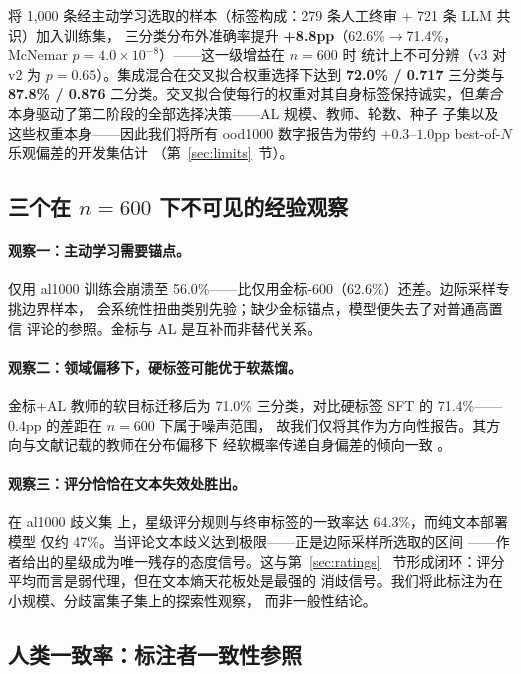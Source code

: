 \documentclass[11pt,a4paper]{article}
\begin{document}
将 1{,}000 条经主动学习选取的样本（标签构成：279 条人工终审 +
721 条 LLM 共识）加入训练集，
三分类分布外准确率提升 \textbf{+8.8pp}（62.6\%$\to$71.4\%，
McNemar $p = 4.0\times10^{-8}$）——这一级增益在 $n{=}600$ 时
统计上不可分辨（v3 对 v2 为 $p = 0.65$）。集成混合在交叉拟合权重选择下达到
\textbf{72.0\% / 0.717} 三分类与 \textbf{87.8\% / 0.876}
二分类。交叉拟合使每行的权重对其自身标签保持诚实，但\emph{集合}
本身驱动了第二阶段的全部选择决策——AL 规模、教师、轮数、种子
子集以及这些权重本身——因此我们将所有 ood1000 数字报告为带约
$+0.3$--$1.0$pp best-of-$N$ 乐观偏差的开发集估计
（第~\ref{sec:limits}~节）。

\subsection{三个在 $n{=}600$ 下不可见的经验观察}
\label{sec:findings}

\paragraph{观察一：主动学习需要锚点。} 仅用 al1000 训练会崩溃至
56.0\%——比仅用金标-600（62.6\%）还差。边际采样专挑边界样本，
会系统性扭曲类别先验；缺少金标锚点，模型便失去了对普通高置信
评论的参照。金标与 AL 是互补而非替代关系。

\paragraph{观察二：领域偏移下，硬标签可能优于软蒸馏。} 金标+AL
教师的软目标迁移后为 71.0\% 三分类，对比硬标签
SFT 的 71.4\%——0.4pp 的差距在 $n{=}600$ 下属于噪声范围，
故我们仅将其作为方向性报告。其方向与文献记载的教师在分布偏移下
经软概率传递自身偏差的倾向一致 \citep{zhang2023shiftkd}。

\paragraph{观察三：评分恰恰在文本失效处胜出。} 在 al1000 歧义集
上，星级评分规则与终审标签的一致率达 64.3\%，而纯文本部署模型
仅约 47\%。当评论文本歧义达到极限——正是边际采样所选取的区间
——作者给出的星级成为唯一残存的态度信号。这与第~\ref{sec:ratings}~
节形成闭环：评分平均而言是弱代理，但在文本熵天花板处是最强的
消歧信号。我们将此标注为在小规模、分歧富集子集上的探索性观察，
而非一般性结论。

\subsection{人类一致率：标注者一致性参照}
\label{sec:iaa}
\end{document}
